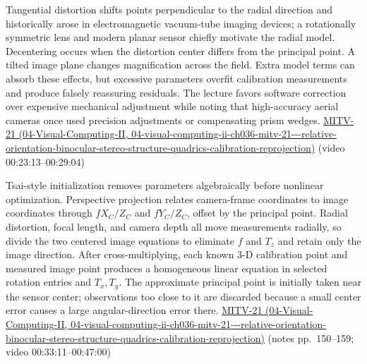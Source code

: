 Tangential distortion shifts points perpendicular to the radial direction and historically arose in electromagnetic vacuum-tube imaging devices; a rotationally symmetric lens and modern planar sensor chiefly motivate the radial model. Decentering occurs when the distortion center differs from the principal point. A tilted image plane changes magnification across the field. Extra model terms can absorb these effects, but excessive parameters overfit calibration measurements and produce falsely reassuring residuals. The lecture favors software correction over expensive mechanical adjustment while noting that high-accuracy aerial cameras once used precision adjustments or compensating prism wedges. \href{../04-Visual-Computing-II/main.pdf\#nameddest=04-visual-computing-ii-ch036-mitv-21---relative-orientation-binocular-stereo-structure-quadrics-calibration-reprojection}{MITV-21 (04-Visual-Computing-II, 04-visual-computing-ii-ch036-mitv-21-\/-\/-relative-orientation-binocular-stereo-structure-quadrics-calibration-reprojection)} (video 00:23:13--00:29:04)

Tsai-style initialization removes parameters algebraically before nonlinear optimization. Perspective projection relates camera-frame coordinates to image coordinates through \(fX_C/Z_C\) and \(fY_C/Z_C\), offset by the principal point. Radial distortion, focal length, and camera depth all move measurements radially, so divide the two centered image equations to eliminate \(f\) and \(T_z\) and retain only the image direction. After cross-multiplying, each known 3-D calibration point and measured image point produces a homogeneous linear equation in selected rotation entries and \(T_x,T_y\). The approximate principal point is initially taken near the sensor center; observations too close to it are discarded because a small center error causes a large angular-direction error there. \href{../04-Visual-Computing-II/main.pdf\#nameddest=04-visual-computing-ii-ch036-mitv-21---relative-orientation-binocular-stereo-structure-quadrics-calibration-reprojection}{MITV-21 (04-Visual-Computing-II, 04-visual-computing-ii-ch036-mitv-21-\/-\/-relative-orientation-binocular-stereo-structure-quadrics-calibration-reprojection)} (notes pp.~150--159; video 00:33:11--00:47:00)

